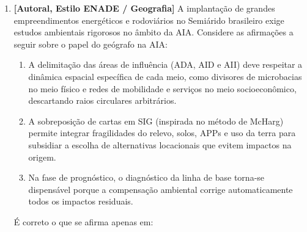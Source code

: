 \begin{enumerate}[leftmargin=1.8em, itemsep=5pt, resume]
  \item \textbf{[Autoral, Estilo ENADE / Geografia]} A implantação de grandes empreendimentos energéticos e rodoviários no Semiárido brasileiro exige estudos ambientais rigorosos no âmbito da AIA. Considere as afirmações a seguir sobre o papel do geógrafo na AIA:
  \begin{enumerate}[label=\Roman*., leftmargin=2.0em, itemsep=2pt]
    \item A delimitação das áreas de influência (ADA, AID e AII) deve respeitar a dinâmica espacial específica de cada meio, como divisores de microbacias no meio físico e redes de mobilidade e serviços no meio socioeconômico, descartando raios circulares arbitrários.
    \item A sobreposição de cartas em SIG (inspirada no método de McHarg) permite integrar fragilidades do relevo, solos, APPs e uso da terra para subsidiar a escolha de alternativas locacionais que evitem impactos na origem.
    \item Na fase de prognóstico, o diagnóstico da linha de base torna-se dispensável porque a compensação ambiental corrige automaticamente todos os impactos residuais.
  \end{enumerate}
  É correto o que se afirma apenas em:
  \espacoResolucao[1.2cm]


\end{enumerate}
